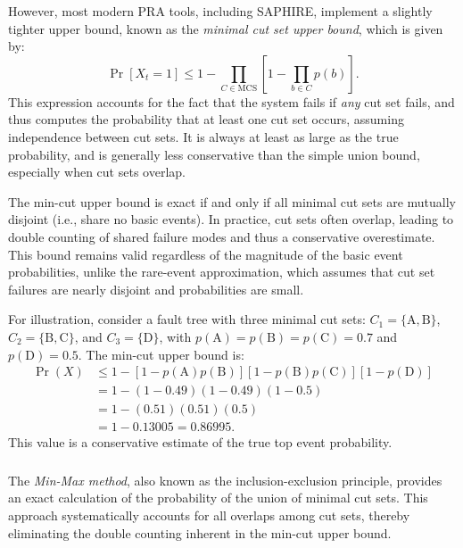 However, most modern PRA tools, including SAPHIRE, implement a slightly tighter upper bound, known as the \emph{minimal cut set upper bound}, which is given by:
\begin{equation}
\label{eq:mcub}
\Pr\left[X_t = 1\right] \leq 1 - \prod_{C \in \mathrm{MCS}} \left[1 - \prod_{b \in C} p(b)\right].
\end{equation}
This expression accounts for the fact that the system fails if \emph{any} cut set fails, and thus computes the probability that at least one cut set occurs, assuming independence between cut sets. It is always at least as large as the true probability, and is generally less conservative than the simple union bound, especially when cut sets overlap.

The min-cut upper bound is exact if and only if all minimal cut sets are mutually disjoint (i.e., share no basic events). In practice, cut sets often overlap, leading to double counting of shared failure modes and thus a conservative overestimate. This bound remains valid regardless of the magnitude of the basic event probabilities, unlike the rare-event approximation, which assumes that cut set failures are nearly disjoint and probabilities are small.

For illustration, consider a fault tree with three minimal cut sets: $C_1 = \{\text{A}, \text{B}\}$, $C_2 = \{\text{B}, \text{C}\}$, and $C_3 = \{\text{D}\}$, with $p(\text{A}) = p(\text{B}) = p(\text{C}) = 0.7$ and $p(\text{D}) = 0.5$. The min-cut upper bound is:
\begin{align}
\Pr(X) &\leq 1 - \left[1 - p(\text{A})p(\text{B})\right]\left[1 - p(\text{B})p(\text{C})\right]\left[1 - p(\text{D})\right] \\
&= 1 - (1 - 0.49)(1 - 0.49)(1 - 0.5) \\
&= 1 - (0.51)(0.51)(0.5) \\
&= 1 - 0.13005 = 0.86995.
\end{align}
This value is a conservative estimate of the true top event probability.

\subsubsection{\color{green}{The Min-Max Method}}
The \emph{Min-Max method}, also known as the inclusion-exclusion principle, provides an exact calculation of the probability of the union of minimal cut sets. This approach systematically accounts for all overlaps among cut sets, thereby eliminating the double counting inherent in the min-cut upper bound.


